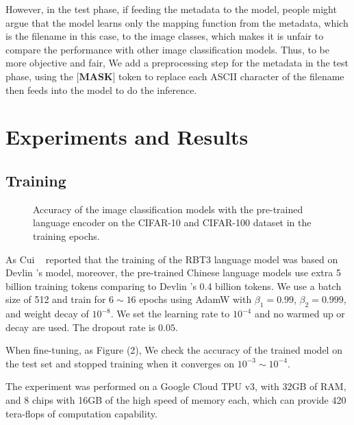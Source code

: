 \documentclass[10pt,twocolumn,letterpaper]{article}
\begin{document}
\par However, in the test phase, if feeding the metadata to the model, people might argue that the model learns only the mapping function from
the metadata, which is the filename in this case, to the image classes, which makes it is unfair to compare the performance with other image classification models.
Thus, to be more objective and fair, We add a preprocessing step for the metadata in the test phase, using the $\textbf{[MASK]}$ token to replace each
ASCII character of the filename then feeds into the model to do the inference.


\section{Experiments and Results}


\subsection{Training}

\begin{figure*}
\begin{center}
\end{center}
   \caption{Accuracy of the image classification models with the pre-trained language encoder on the CIFAR-10 and CIFAR-100 dataset in the training epochs.}
\label{fig:short}
\end{figure*}


As Cui \etal~\cite{cui2020revisiting} reported that the training of the RBT3 language model was based on Devlin \etal's model,
moreover, the pre-trained Chinese language models use extra 5 billion training tokens comparing to Devlin \etal's 0.4 billion tokens.
We use a batch size of 512 and train for $6\sim16$ epochs using AdamW with $\beta_1=0.99$, $\beta_2=0.999$, and weight decay of $10^{-8}$.
We set the learning rate to $10^{-4}$ and no warmed up or decay are used.
The dropout rate is $0.05$.

\par When fine-tuning, as Figure (2), We check the accuracy of the trained model on the test set and stopped training when it converges on $10^{-3}\sim10^{-4}$.

\par The experiment was performed on a Google Cloud TPU v3, with 32GB of RAM, and 8 chips with 16GB of the high speed of memory each,
which can provide 420 tera-flops of computation capability.
\end{document}
